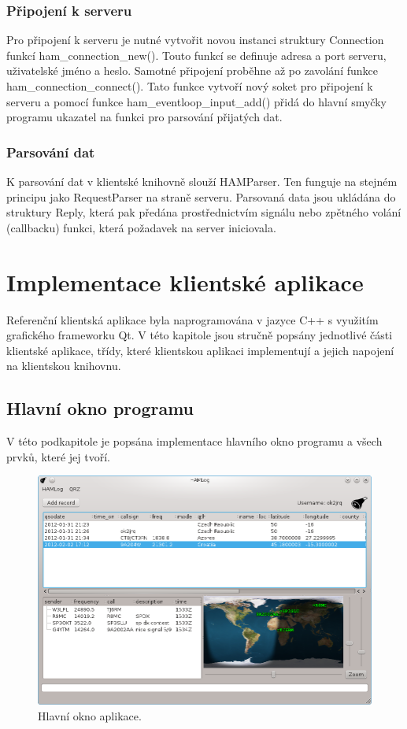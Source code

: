 \subsubsection{Připojení k serveru}

Pro připojení k serveru je nutné vytvořit novou instanci struktury Connection funkcí ham\_connection\_new(). Touto funkcí
se definuje adresa a port serveru, uživatelské jméno a heslo. Samotné připojení proběhne až po zavolání funkce
ham\_connection\_connect(). Tato funkce vytvoří nový soket pro připojení k serveru a pomocí funkce ham\_eventloop\_input\_add()
přidá do hlavní smyčky programu ukazatel na funkci pro parsování přijatých dat.

\subsubsection{Parsování dat}

K parsování dat v klientské knihovně slouží HAMParser. Ten funguje na stejném principu jako RequestParser na straně serveru.
Parsovaná data jsou ukládána do struktury Reply, která pak předána prostřednictvím signálu nebo zpětného volání (callbacku)
funkci, která požadavek na server iniciovala.

\section{Implementace klientské aplikace}
\label{implementace_klient}

Referenční klientská aplikace byla naprogramována v jazyce C++ s využitím grafického frameworku Qt. V této kapitole jsou stručně
popsány jednotlivé části klientské aplikace, třídy, které klientskou aplikaci implementují a jejich napojení na klientskou knihovnu.

\subsection{Hlavní okno programu}

V této podkapitole je popsána implementace hlavního okno programu a všech prvků, které jej tvoří.

\begin{figure}[h]
\centering
\includegraphics[trim=0cm 0cm 0cm 0cm, scale=0.7]{fig/ham3}
\caption{Hlavní okno aplikace.}
\label{fig:FigureExample}
\end{figure}

